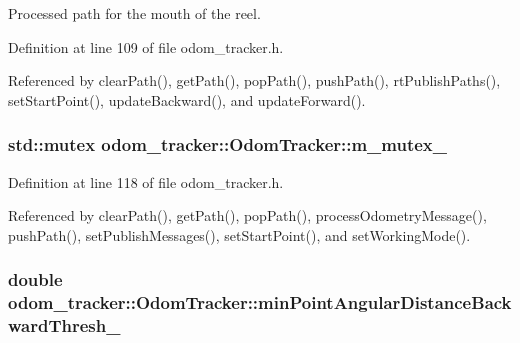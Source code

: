 Processed path for the mouth of the reel. 



Definition at line 109 of file odom\+\_\+tracker.\+h.



Referenced by clear\+Path(), get\+Path(), pop\+Path(), push\+Path(), rt\+Publish\+Paths(), set\+Start\+Point(), update\+Backward(), and update\+Forward().

\subsubsection[{\texorpdfstring{m\+\_\+mutex\+\_\+}{m_mutex_}}]{\setlength{\rightskip}{0pt plus 5cm}std\+::mutex odom\+\_\+tracker\+::\+Odom\+Tracker\+::m\+\_\+mutex\+\_\+\hspace{0.3cm}{\ttfamily [protected]}}\hypertarget{classodom__tracker_1_1OdomTracker_a17f1d82ae3d6441a4387af8fb83a3e20}{}\label{classodom__tracker_1_1OdomTracker_a17f1d82ae3d6441a4387af8fb83a3e20}


Definition at line 118 of file odom\+\_\+tracker.\+h.



Referenced by clear\+Path(), get\+Path(), pop\+Path(), process\+Odometry\+Message(), push\+Path(), set\+Publish\+Messages(), set\+Start\+Point(), and set\+Working\+Mode().

\subsubsection[{\texorpdfstring{min\+Point\+Angular\+Distance\+Backward\+Thresh\+\_\+}{minPointAngularDistanceBackwardThresh_}}]{\setlength{\rightskip}{0pt plus 5cm}double odom\+\_\+tracker\+::\+Odom\+Tracker\+::min\+Point\+Angular\+Distance\+Backward\+Thresh\+\_\+\hspace{0.3cm}{\ttfamily [protected]}}\hypertarget{classodom__tracker_1_1OdomTracker_a6b9214dccdd97870e2baf8ab51d47727}{}\label{classodom__tracker_1_1OdomTracker_a6b9214dccdd97870e2baf8ab51d47727}


